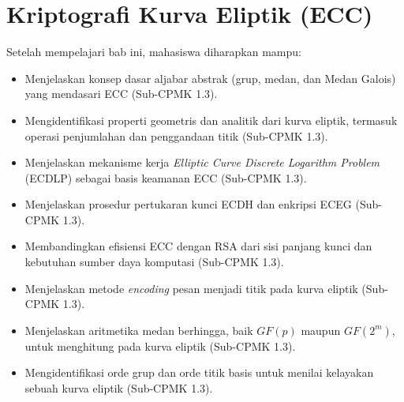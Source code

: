 \documentclass[../../main.tex]{subfiles}
\begin{document}
\chapter{Kriptografi Kurva Eliptik (ECC)}
\label{chap:ecc}

\begin{learningoutcome}
Setelah mempelajari bab ini, mahasiswa diharapkan mampu:
\begin{itemize}
    \item Menjelaskan konsep dasar aljabar abstrak (grup, medan, dan Medan Galois) yang mendasari ECC (Sub-CPMK 1.3).
    \item Mengidentifikasi properti geometris dan analitik dari kurva eliptik, termasuk operasi penjumlahan dan penggandaan titik (Sub-CPMK 1.3).
    \item Menjelaskan mekanisme kerja \textit{Elliptic Curve Discrete Logarithm Problem} (ECDLP) sebagai basis keamanan ECC (Sub-CPMK 1.3).
    \item Menjelaskan prosedur pertukaran kunci ECDH dan enkripsi ECEG (Sub-CPMK 1.3).
    \item Membandingkan efisiensi ECC dengan RSA dari sisi panjang kunci dan kebutuhan sumber daya komputasi (Sub-CPMK 1.3).
    \item Menjelaskan metode \textit{encoding} pesan menjadi titik pada kurva eliptik (Sub-CPMK 1.3).
    \item Menjelaskan aritmetika medan berhingga, baik $GF(p)$ maupun $GF(2^m)$, untuk menghitung pada kurva eliptik (Sub-CPMK 1.3).
    \item Mengidentifikasi orde grup dan orde titik basis untuk menilai kelayakan sebuah kurva eliptik (Sub-CPMK 1.3).
\end{itemize}
\end{learningoutcome}










\end{document}
